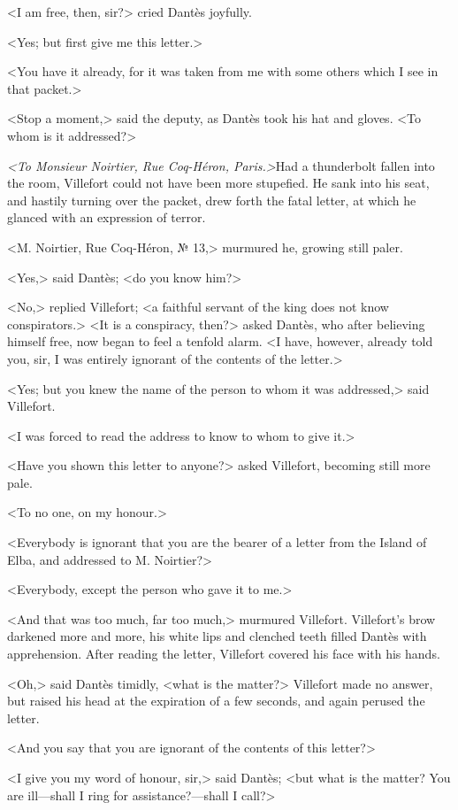  <I am free, then, sir?> cried Dantès joyfully. 

 <Yes; but first give me this letter.> 

 <You have it already, for it was taken from me with some others which I see in that packet.> 

 <Stop a moment,> said the deputy, as Dantès took his hat and gloves. <To whom is it addressed?> 

 \textit{<To Monsieur Noirtier, Rue Coq-Héron, Paris.>}Had a thunderbolt fallen into the room, Villefort could not have been more stupefied. He sank into his seat, and hastily turning over the packet, drew forth the fatal letter, at which he glanced with an expression of terror. 

 <M. Noirtier, Rue Coq-Héron, № 13,> murmured he, growing still paler. 

 <Yes,> said Dantès; <do you know him?> 

 <No,> replied Villefort; <a faithful servant of the king does not know conspirators.>  <It is a conspiracy, then?> asked Dantès, who after believing himself free, now began to feel a tenfold alarm. <I have, however, already told you, sir, I was entirely ignorant of the contents of the letter.> 

 <Yes; but you knew the name of the person to whom it was addressed,> said Villefort. 

 <I was forced to read the address to know to whom to give it.> 

 <Have you shown this letter to anyone?> asked Villefort, becoming still more pale. 

 <To no one, on my honour.> 

 <Everybody is ignorant that you are the bearer of a letter from the Island of Elba, and addressed to M. Noirtier?> 

 <Everybody, except the person who gave it to me.> 

 <And that was too much, far too much,> murmured Villefort. Villefort's brow darkened more and more, his white lips and clenched teeth filled Dantès with apprehension. After reading the letter, Villefort covered his face with his hands. 

 <Oh,> said Dantès timidly, <what is the matter?> Villefort made no answer, but raised his head at the expiration of a few seconds, and again perused the letter. 

 <And you say that you are ignorant of the contents of this letter?> 

 <I give you my word of honour, sir,> said Dantès; <but what is the matter? You are ill—shall I ring for assistance?—shall I call?> 

